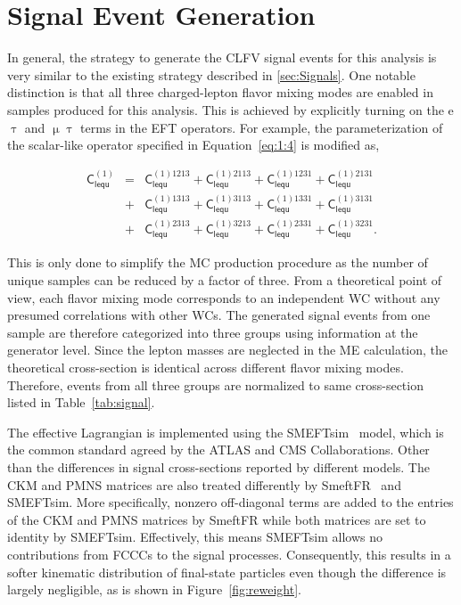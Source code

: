 \section{Signal Event Generation}
\label{sec:SigGen}

In general, the strategy to generate the \ac{CLFV} signal events for this analysis is very similar to the existing strategy described in \autoref{sec:Signals}. One notable distinction is that all three charged-lepton flavor mixing modes are enabled in samples produced for this analysis. This is achieved by explicitly turning on the e$\uptau$ and $\upmu\uptau$ terms in the \ac{EFT} operators. For example, the parameterization of the scalar-like operator specified in Equation~\ref{eq:1:4} is modified as,

\begin{eqnarray}
\textsf{C}_{\textsf{lequ}}^{(1)}  
 &=& \textsf{C}_{\textsf{lequ}}^{(1)1213}
 + \textsf{C}_{\textsf{lequ}}^{(1)2113}
 + \textsf{C}_{\textsf{lequ}}^{(1)1231}
 + \textsf{C}_{\textsf{lequ}}^{(1)2131} \nonumber\\
 &+& \textsf{C}_{\textsf{lequ}}^{(1)1313}
 + \textsf{C}_{\textsf{lequ}}^{(1)3113}
 + \textsf{C}_{\textsf{lequ}}^{(1)1331}
 + \textsf{C}_{\textsf{lequ}}^{(1)3131} \\
 &+& \textsf{C}_{\textsf{lequ}}^{(1)2313}
 + \textsf{C}_{\textsf{lequ}}^{(1)3213}
 + \textsf{C}_{\textsf{lequ}}^{(1)2331}
 + \textsf{C}_{\textsf{lequ}}^{(1)3231}. \nonumber
\label{eq:example}
\end{eqnarray}

This is only done to simplify the \ac{MC} production procedure as the number of unique samples can be reduced by a factor of three. From a theoretical point of view, each flavor mixing mode corresponds to an independent \ac{WC} without any presumed correlations with other \acp{WC}. The generated signal events from one sample are therefore categorized into three groups using information at the generator level. Since the lepton masses are neglected in the \ac{ME} calculation, the theoretical cross-section is identical across different flavor mixing modes. Therefore, events from all three groups are normalized to same cross-section listed in Table~\ref{tab:signal}. 

The effective Lagrangian is implemented using the SMEFTsim~\cite{Brivio:2017btx} model, which is the common standard agreed by the \ac{ATLAS} and \ac{CMS} Collaborations. Other than the differences in signal cross-sections reported by different models. The \ac{CKM} and \ac{PMNS} matrices are also treated differently by SmeftFR~\cite{Dedes:2019uzs} and SMEFTsim. More specifically, nonzero off-diagonal terms are added to the entries of the \ac{CKM} and \ac{PMNS} matrices by SmeftFR while both matrices are set to identity by SMEFTsim. Effectively, this means SMEFTsim allows no contributions from \acp{FCCC} to the signal processes. Consequently, this results in a softer kinematic distribution of final-state particles even though the difference is largely negligible, as is shown in Figure~\ref{fig:reweight}.

